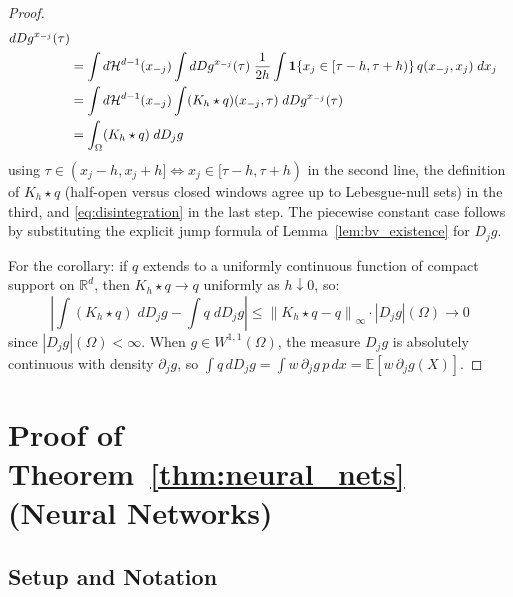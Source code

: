 \documentclass[12pt,a4paper]{article}
\numberwithin{equation}{section}
\theoremstyle{plain}
\theoremstyle{definition}
\newcommand{\norm}[1]{\left\| #1 \right\|}
\newcommand{\R}{\mathbb{R}}
\newcommand{\E}{\mathbb{E}}
\newcommand{\abs}[1]{\left| #1 \right|}
\begin{document}
\begin{proof}
\begin{align}
			d D g^{x_{-j}}(\tau) \notag \\
			&= \int d\mathcal{H}^{d-1}(x_{-j}) \int d D g^{x_{-j}}(\tau)\;
			\frac{1}{2h} \int \mathbf{1}\{x_j \in [\tau - h, \tau + h)\}\,
			q(x_{-j}, x_j)\; dx_j \notag \\
			&= \int d\mathcal{H}^{d-1}(x_{-j}) \int (K_h \star q)(x_{-j}, \tau)\;
			d D g^{x_{-j}}(\tau) \notag \\
			&= \int_\Omega (K_h \star q)\; d D_j g
		\end{align}
		using $\tau \in (x_j - h, x_j + h] \Leftrightarrow
		x_j \in [\tau - h, \tau + h)$ in the second line, the definition of
		$K_h \star q$ (half-open versus closed windows agree up to Lebesgue-null
		sets) in the third, and \eqref{eq:disintegration} in the last step. The
		piecewise constant case follows by substituting the explicit jump formula of
		Lemma~\ref{lem:bv_existence} for $D_j g$.
		
		For the corollary: if $q$ extends to a uniformly continuous function of
		compact support on $\R^d$, then $K_h \star q \to q$ uniformly as
		$h \downarrow 0$, so:
		\begin{equation}
			\abs{\int (K_h \star q)\; d D_j g - \int q\; d D_j g}
			\leq \norm{K_h \star q - q}_\infty \cdot \abs{D_j g}(\Omega) \to 0
		\end{equation}
		since $\abs{D_j g}(\Omega) < \infty$. When $g \in W^{1,1}(\Omega)$, the
		measure $D_j g$ is absolutely continuous with density $\partial_j g$, so
		$\int q\, d D_j g = \int w\, \partial_j g\, p\, dx
		= \E[w\, \partial_j g(X)]$.
	\end{proof}
	
	\section{Proof of Theorem~\ref{thm:neural_nets} (Neural Networks)}
	\label{app:neural_nets}
	
	\subsection{Setup and Notation}
	
\end{document}
